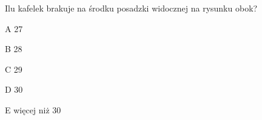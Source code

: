\begin{tresc}
Ilu kafelek brakuje na środku posadzki widocznej na rysunku obok?
\end{tresc}
\begin{wariant}{A} 27 \end{wariant}
\begin{wariant}{B} 28 \end{wariant}
\begin{wariant}{C} 29 \end{wariant}
\begin{wariant}{D} 30 \end{wariant}
\begin{wariant}{E} więcej niż 30 \end{wariant}

